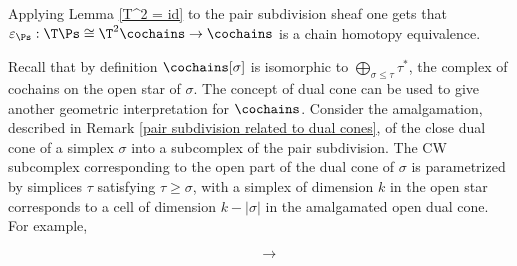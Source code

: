 \documentclass[main.tex]{subfiles}
\begin{document}
\begin{remark}\label{dual of pair subdivision related to relative dual cones}
Applying Lemma \ref{T^2 = id} to the pair subdivision sheaf one gets that $\varepsilon_{\Ps}:\T \Ps\cong \T^2\cochains\to \cochains$ is a chain homotopy equivalence.

Recall that by definition $\cochains[\sigma]$ is isomorphic to $\bigoplus_{\sigma\leq\tau}\tau^*$, the complex of cochains on the open star of $\sigma$. The concept of dual cone can be used to give another geometric interpretation for $\cochains$. Consider the amalgamation, described in Remark \ref{pair subdivision related to dual cones}, of the close dual cone of a simplex $\sigma$ into a subcomplex of the pair subdivision. The CW subcomplex corresponding to the open part of the dual cone of $\sigma$ is parametrized by simplices $\tau$ satisfying $\tau\geq\sigma$, with a simplex of dimension $k$ in the open star corresponds to a cell of dimension $k-|\sigma|$ in the amalgamated open dual cone. For example, \vspace*{6pt}

\begin{minipage}{4cm}
\begin{center}\hspace*{1.7cm}
\end{center}
\end{minipage}
\begin{minipage}{3cm}
\vspace*{-.6cm}$$\ \ \ \ \ \ \longrightarrow$$
\end{minipage}
\begin{minipage}{5cm}
\begin{center}
\end{center}
\end{minipage}
\end{remark}
\end{document}
